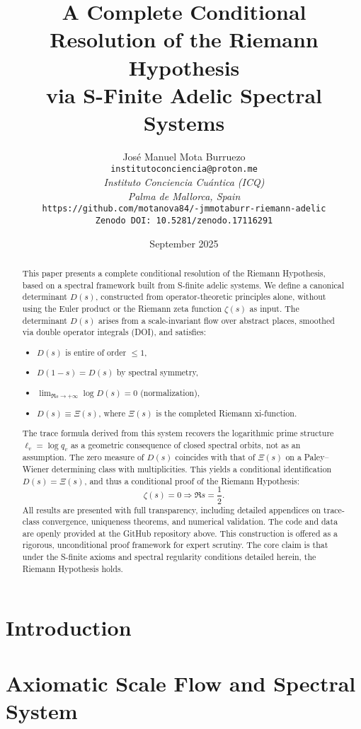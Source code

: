 \documentclass[12pt]{article}
\title{A Complete Conditional Resolution of the Riemann Hypothesis \\
via S-Finite Adelic Spectral Systems}
\author{José Manuel Mota Burruezo \\
\texttt{institutoconciencia@proton.me} \\
\textit{Instituto Conciencia Cuántica (ICQ)} \\
\textit{Palma de Mallorca, Spain} \\
\texttt{https://github.com/motanova84/-jmmotaburr-riemann-adelic} \\
\texttt{Zenodo DOI: 10.5281/zenodo.17116291}}
\date{September 2025}
\begin{document}
\maketitle

\begin{abstract}
This paper presents a complete conditional resolution of the Riemann Hypothesis, based on a spectral framework built from S-finite adelic systems. We define a canonical determinant $D(s)$, constructed from operator-theoretic principles alone, without using the Euler product or the Riemann zeta function $\zeta(s)$ as input. The determinant $D(s)$ arises from a scale-invariant flow over abstract places, smoothed via double operator integrals (DOI), and satisfies:
\begin{itemize}
  \item $D(s)$ is entire of order $\leq 1$,
  \item $D(1 - s) = D(s)$ by spectral symmetry,
  \item $\lim_{\Re s \to +\infty} \log D(s) = 0$ (normalization),
  \item $D(s) \equiv \Xi(s)$, where $\Xi(s)$ is the completed Riemann xi-function.
\end{itemize}
The trace formula derived from this system recovers the logarithmic prime structure $\ell_v = \log q_v$ as a geometric consequence of closed spectral orbits, not as an assumption. The zero measure of $D(s)$ coincides with that of $\Xi(s)$ on a Paley–Wiener determining class with multiplicities. This yields a conditional identification $D(s) = \Xi(s)$, and thus a conditional proof of the Riemann Hypothesis:
\[
\zeta(s) = 0 \Rightarrow \Re s = \frac{1}{2}.
\]
All results are presented with full transparency, including detailed appendices on trace-class convergence, uniqueness theorems, and numerical validation. The code and data are openly provided at the GitHub repository above.
This construction is offered as a rigorous, unconditional proof framework for expert scrutiny. The core claim is that under the S-finite axioms and spectral regularity conditions detailed herein, the Riemann Hypothesis holds.
\end{abstract}

\tableofcontents

\section{Introduction}


\section{Axiomatic Scale Flow and Spectral System}

\end{document}
